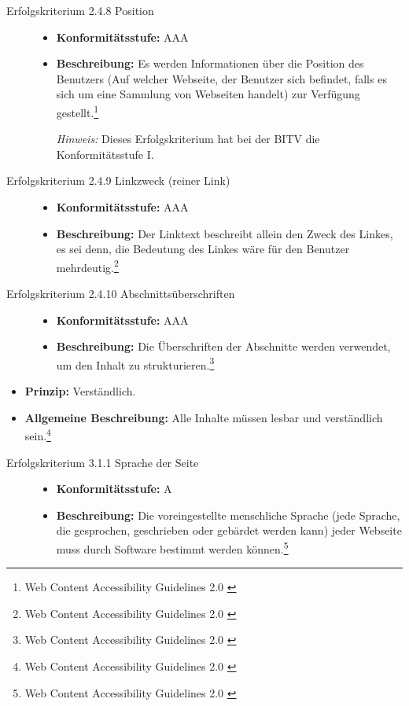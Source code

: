 \begin{description}
\begin{description}
		\item[Erfolgskriterium 2.4.8 Position]\hfill
		\begin{itemize}
			\item \textbf{Konformitätsstufe:} AAA
			\item \textbf{Beschreibung:} Es werden Informationen über die Position des Benutzers (Auf welcher Webseite, der Benutzer sich befindet, falls es sich um eine 
			Sammlung von Webseiten handelt) zur Verfügung gestellt.\footnote{Web Content Accessibility Guidelines 2.0 \cite{WCAG2.0}}
			
			\textit{Hinweis:} Dieses Erfolgskriterium hat bei der \ac{BITV} die Konformitätsstufe I.
		\end{itemize}
		
		\item[Erfolgskriterium 2.4.9 Linkzweck (reiner Link)]\hfill
		\begin{itemize}
			\item \textbf{Konformitätsstufe:} AAA
			\item \textbf{Beschreibung:} Der Linktext beschreibt allein den Zweck des Linkes, es sei denn, die Bedeutung des Linkes wäre für den Benutzer 
			mehrdeutig.\footnote{Web Content Accessibility Guidelines 2.0 \cite{WCAG2.0}}
		\end{itemize}
		
		\item[Erfolgskriterium 2.4.10 Abschnittsüberschriften]\hfill
		\begin{itemize}
			\item \textbf{Konformitätsstufe:} AAA
			\item \textbf{Beschreibung:} Die Überschriften der Abschnitte werden verwendet, um den Inhalt zu 
			strukturieren.\footnote{Web Content Accessibility Guidelines 2.0 \cite{WCAG2.0}}
		\end{itemize}
	\end{description}	
	
	\item[Richtlinie 3.1 Lesbar]\hfill
	\begin{itemize}
		\item \textbf{Prinzip:} Verständlich.
		\item \textbf{Allgemeine Beschreibung:} Alle Inhalte müssen lesbar und verständlich sein.\footnote{Web Content Accessibility Guidelines 2.0 \cite{WCAG2.0}}
	\end{itemize}
	
	\begin{description}
		\item[Erfolgskriterium 3.1.1 Sprache der Seite]\hfill
		\begin{itemize}
			\item \textbf{Konformitätsstufe:} A
			\item \textbf{Beschreibung:} Die voreingestellte menschliche Sprache (jede Sprache, die gesprochen, geschrieben oder gebärdet werden kann) jeder Webseite muss 
			durch Software bestimmt werden können.\footnote{Web Content Accessibility Guidelines 2.0 \cite{WCAG2.0}}
		\end{itemize}
		

\end{description}
\end{description}

